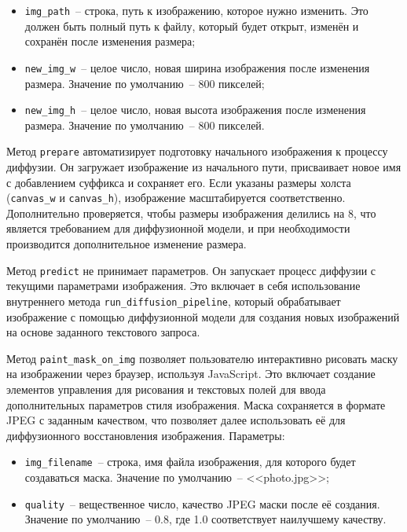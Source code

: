 \begin{itemize}
    \item \lstinline{img_path}~-- строка, путь к изображению, которое нужно изменить. Это должен быть полный путь к файлу, который будет открыт, изменён и сохранён после изменения размера;
    \item \lstinline{new_img_w}~-- целое число, новая ширина изображения после изменения размера. Значение по умолчанию~-- 800 пикселей;
    \item \lstinline{new_img_h}~-- целое число, новая высота изображения после изменения размера. Значение по умолчанию~-- 800 пикселей.
\end{itemize}

Метод \lstinline{prepare} автоматизирует подготовку начального изображения к процессу диффузии. Он загружает изображение из начального пути, присваивает новое имя с добавлением суффикса и сохраняет его. Если указаны размеры холста (\lstinline{canvas_w} и \lstinline{canvas_h}), изображение масштабируется соответственно. Дополнительно проверяется, чтобы размеры изображения делились на 8, что является требованием для диффузионной модели, и при необходимости производится дополнительное изменение размера.

Метод \lstinline{predict} не принимает параметров. Он запускает процесс диффузии с текущими параметрами изображения. Это включает в себя использование внутреннего метода \lstinline{run_diffusion_pipeline}, который обрабатывает изображение с помощью диффузионной модели для создания новых изображений на основе заданного текстового запроса.

Метод \lstinline{paint_mask_on_img} позволяет пользователю интерактивно рисовать маску на изображении через браузер, используя JavaScript. Это включает создание элементов управления для рисования и текстовых полей для ввода дополнительных параметров стиля изображения. Маска сохраняется в формате JPEG с заданным качеством, что позволяет далее использовать её для диффузионного восстановления изображения. Параметры:

\begin{itemize}
    \item \lstinline{img_filename}~-- строка, имя файла изображения, для которого будет создаваться маска. Значение по умолчанию~-- <<photo.jpg>>;
    \item \lstinline{quality}~-- вещественное число, качество JPEG маски после её создания. Значение по умолчанию~-- 0.8, где 1.0 соответствует наилучшему качеству.
\end{itemize}

